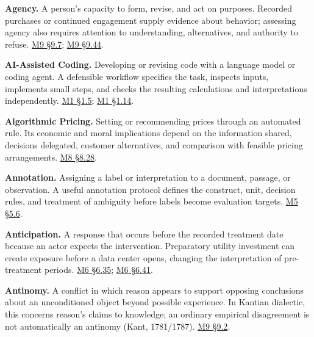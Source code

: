 \noindent\textbf{Agency.} A person's capacity to form, revise, and act on
purposes. Recorded purchases or continued engagement supply evidence
about behavior; assessing agency also requires attention to
understanding, alternatives, and authority to refuse.
\hyperref[M09-personalization-learning-and-the-ability-to-revise-a-goal]{M9
§9.7};
\hyperref[M09-personalization-and-the-learners-authority]{M9
§9.44}.

\noindent\textbf{AI-Assisted Coding.} Developing or revising code with a language
model or coding agent. A defensible workflow specifies the task,
inspects inputs, implements small steps, and checks the resulting
calculations and interpretations independently.
\href{Marketing_Analytics_Lecture_Notes.pdf\#M01-ai-assisted-coding-as-a-sequence-of-verifiable-steps}{M1
§1.5};
\href{Marketing_Analytics_Lecture_Notes.pdf\#M01-specifications-independent-checks-and-retained-skills}{M1
§1.14}.

\noindent\textbf{Algorithmic Pricing.} Setting or recommending prices through an
automated rule. Its economic and moral implications depend on the
information shared, decisions delegated, customer alternatives, and
comparison with feasible pricing arrangements.
\href{Marketing_Analytics_Lecture_Notes.pdf\#M08-shared-pricing-systems-and-customer-choice}{M8
§8.28}.

\noindent\textbf{Annotation.} Assigning a label or interpretation to a document,
passage, or observation. A useful annotation protocol defines the
construct, unit, decision rules, and treatment of ambiguity before
labels become evaluation targets.
\href{Marketing_Analytics_Lecture_Notes.pdf\#M05-human-and-llm-annotation}{M5
§5.6}.

\noindent\textbf{Anticipation.} A response that occurs before the recorded
treatment date because an actor expects the intervention. Preparatory
utility investment can create exposure before a data center opens,
changing the interpretation of pre-treatment periods.
\href{Marketing_Analytics_Lecture_Notes.pdf\#M06-institutional-exposure-and-the-meaning-of-an-untreated-utility}{M6
§6.35};
\href{Marketing_Analytics_Lecture_Notes.pdf\#M06-phantom-projects-and-the-meaning-of-a-control}{M6
§6.41}.

\noindent\textbf{Antinomy.} A conflict in which reason appears to support
opposing conclusions about an unconditioned object beyond possible
experience. In Kantian dialectic, this concerns reason's claims to
knowledge; an ordinary empirical disagreement is not automatically an
antinomy (Kant, 1781/1787).
\hyperref[M09-transcendental-dialectic-and-the-limits-of-reason]{M9
§9.2}.

